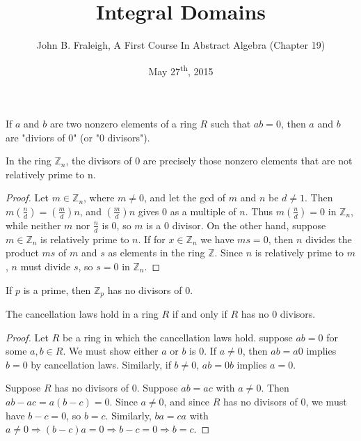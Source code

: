 \documentclass[a4paper,11pt]{article}
\title{Integral Domains}
\author{John B. Fraleigh, A First Course In Abstract Algebra (Chapter 19)}
\date{May 27\textsuperscript{th}, 2015}
\begin{document}
\maketitle
{}

\begin{outline}

    If \(a\) and \(b\) are two nonzero elements of a ring \(R\) such that \(ab = 0\), then \(a\) and 
    \(b\) are "diviors of \(0\)" (or "\(0\) divisors").

    In the ring \(\mathbb{Z}_n\), the divisors of \(0\) are precisely those nonzero elements that are 
    not relatively prime to n.
    
    \begin{proof}
      Let \(m \in \mathbb{Z}_n\), where \(m \neq 0\), and let the gcd of \(m\) and \(n\) be \(d \neq 1\). Then
      \(m(\frac{n}{d}) = (\frac{m}{d})n\), and \((\frac{m}{d})n\) gives \(0\) as a multiple of \(n\). Thus 
      \(m(\frac{n}{d}) = 0\) in \(\mathbb{Z}_n\), while neither \(m\) nor \(\frac{n}{d}\) is \(0\), so \(m\) 
      is a \(0\) divisor. On the other hand, suppose \(m \in \mathbb{Z}_n\) is relatively prime to \(n\). If 
      for \(x \in \mathbb{Z}_n\) we have \(ms = 0\), then \(n\) divides the product \(ms\) of \(m\) and \(s\) 
      as elements in the ring \(\mathbb{Z}\). Since \(n\) is relatively prime to \(m\), \(n\) must divide \(s\), 
      so \(s = 0\) in \(\mathbb{Z}_n\).
    \end{proof}
      
    If \(p\) is a prime, then \(\mathbb{Z}_p\) has no divisors of \(0\).
      
    The cancellation laws hold in a ring \(R\) if and only if \(R\) has no \(0\) divisors.
    
    \begin{proof}
      \forward
        Let \(R\) be a ring in which the cancellation laws hold. suppose \(ab = 0\) for some \(a, b \in R\).
        We must show either \(a\) or \(b\) is \(0\). If \(a \neq 0\), then \(ab = a0\) implies \(b = 0\) by cancellation laws.
        Similarly, if \(b \neq 0\), \(ab = 0b\) implies \(a = 0\).
        
      \backward
        Suppose \(R\) has no divisors of \(0\). Suppose \(ab = ac\) with \(a \neq 0\). Then  \(ab - ac = a(b-c) = 0\). 
        Since \(a \neq 0\), and since \(R\) has no divisors of \(0\), we must have \(b - c = 0\), so \(b = c\). 
        Similarly, \(ba = ca\) with \(a \neq 0 \Rightarrow (b - c)a = 0 \Rightarrow b - c = 0 \Rightarrow b = c\).
    \end{proof}


\end{outline}
\end{document}
